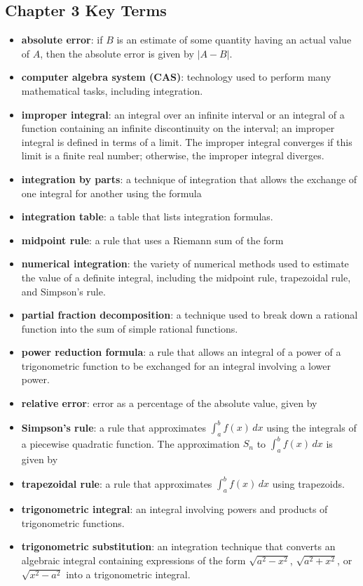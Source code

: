 \documentclass{report}
\begin{document}
    \pagebreak \bigbreak \noindent 
    \subsection{Chapter 3 Key Terms}
    \bigbreak \noindent 
    \begin{itemize}
         \item \textbf{absolute error}: if \( B \) is an estimate of some quantity having an actual value of \( A \), then the absolute error is given by \( |A-B| \).
        \item \textbf{computer algebra system (CAS)}: technology used to perform many mathematical tasks, including integration.
        \item \textbf{improper integral}: an integral over an infinite interval or an integral of a function containing an infinite discontinuity on the interval; an improper integral is defined in terms of a limit. The improper integral converges if this limit is a finite real number; otherwise, the improper integral diverges.
        \item \textbf{integration by parts}: a technique of integration that allows the exchange of one integral for another using the formula 
        \item \textbf{integration table}: a table that lists integration formulas.
        \item \textbf{midpoint rule}: a rule that uses a Riemann sum of the form 
        \item \textbf{numerical integration}: the variety of numerical methods used to estimate the value of a definite integral, including the midpoint rule, trapezoidal rule, and Simpson’s rule.
        \item \textbf{partial fraction decomposition}: a technique used to break down a rational function into the sum of simple rational functions.
        \item \textbf{power reduction formula}: a rule that allows an integral of a power of a trigonometric function to be exchanged for an integral involving a lower power.
        \item \textbf{relative error}: error as a percentage of the absolute value, given by 
        \item \textbf{Simpson’s rule}: a rule that approximates \( \int_{a}^{b} f(x) \, dx \) using the integrals of a piecewise quadratic function. The approximation \( S_n \) to \( \int_{a}^{b} f(x) \, dx \) is given by 
        \item \textbf{trapezoidal rule}: a rule that approximates \( \int_{a}^{b} f(x) \, dx \) using trapezoids.
        \item \textbf{trigonometric integral}: an integral involving powers and products of trigonometric functions.
        \item \textbf{trigonometric substitution}: an integration technique that converts an algebraic integral containing expressions of the form \( \sqrt{a^2 - x^2} \), \( \sqrt{a^2 + x^2} \), or \( \sqrt{x^2 - a^2} \) into a trigonometric integral.
    \end{itemize}
\end{document}
